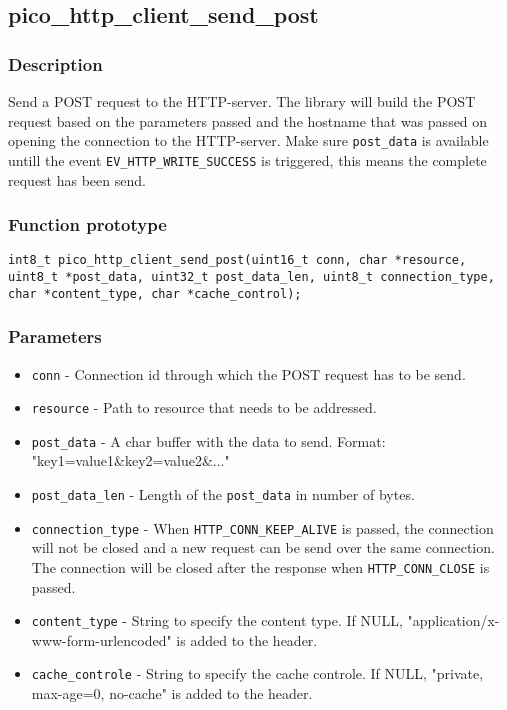
\subsection{pico\_http\_client\_send\_post}

\subsubsection*{Description}
Send a POST request to the HTTP-server. The library will build the POST request based on the parameters passed and the hostname that was passed on opening the connection to the HTTP-server. Make sure \texttt{post\_data} is available untill the event \texttt{EV\_HTTP\_WRITE\_SUCCESS} is triggered, this means the complete request has been send.

\subsubsection*{Function prototype}
\texttt{int8\_t pico\_http\_client\_send\_post(uint16\_t conn, char *resource, uint8\_t *post\_data, uint32\_t post\_data\_len, uint8\_t connection\_type, char *content\_type, char *cache\_control);}

\subsubsection*{Parameters}
\begin{itemize}[noitemsep]
\item \texttt{conn} - Connection id through which the POST request has to be send.
\item \texttt{resource} - Path to resource that needs to be addressed.
\item \texttt{post\_data} - A char buffer with the data to send. Format: "key1=value1\&key2=value2\&..."
\item \texttt{post\_data\_len} - Length of the \texttt{post\_data} in number of bytes.
\item \texttt{connection\_type} - When \texttt{HTTP\_CONN\_KEEP\_ALIVE} is passed, the connection will not be closed and a new request can be send over the same connection. The connection will be closed after the response when \texttt{HTTP\_CONN\_CLOSE} is passed.
\item \texttt{content\_type} - String to specify the content type. If NULL, "application/x-www-form-urlencoded" is added to the header.
\item \texttt{cache\_controle} - String to specify the cache controle. If NULL, "private, max-age=0, no-cache" is added to the header.
\end{itemize}

